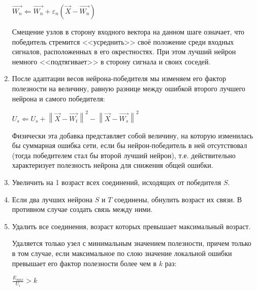 \documentclass[unicode, 12pt, a4paper,oneside,fleqn]{article}
\begin{document}
\begin{enumerate}
  $\vec{W_n} \Leftarrow \vec{W_n}+\varepsilon_n(\vec{X}-\vec{W_n})$

  Смещение узлов в сторону входного вектора на данном шаге означает,
  что победитель стремится <<усреднить>> своё положение среди входных
  сигналов, расположенных в его окрестностях. При этом лучший нейрон
  немного <<подтягивает>> в сторону сигнала и своих соседей.

\item \label{gng-u:8} %
  После адаптации весов нейрона-победителя мы изменяем его фактор
  полезности на величину, равную разнице между ошибкой второго лучшего
  нейрона и самого победителя:

  $U_{s} \Leftarrow U_{s} + \left\|\vec{X}-\vec{W_t}\right\|^{2} -
                            \left\|\vec{X}-\vec{W_s}\right\|^{2}$

  Физически эта добавка представляет собой величину, на которую
  изменилась бы суммарная ошибка сети, если бы нейрон-победитель в ней
  отсутствовал (тогда победителем стал бы второй лучший нейрон),
  т.е. действительно характеризует полезность нейрона для снижения
  общей ошибки.

\item \label{gng-u:9} \label{gng:8}
  Увеличить на 1 возраст всех соединений, исходящих от победителя $S$.

\item \label{gng-u:10} \label{gng:9}
  Если два лучших нейрона $S$ и $T$ соединены, обнулить возраст их
  связи. В противном случае создать связь между ними.


\item \label{gng-u:11} %
  Удалить все соединения, возраст которых превышает максимальный
  возраст.

  Удаляется только узел с минимальным значением полезности, причем
  только в том случае, если максимальное по слою значение локальной
  ошибки превышает его фактор полезности более чем в $k$ раз:

  $\frac{E_{max}}{U_i} > k$

\end{enumerate}
\end{document}
